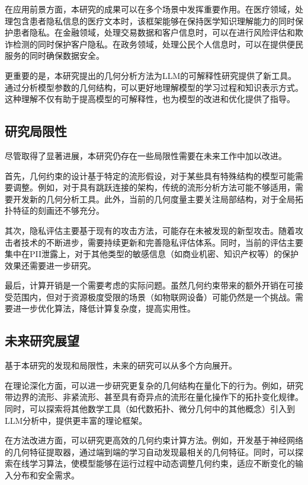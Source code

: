 在应用前景方面，本研究的成果可以在多个场景中发挥重要作用。在医疗领域，处理包含患者隐私信息的医疗文本时，该框架能够在保持医学知识理解能力的同时保护患者隐私。在金融领域，处理交易数据和客户信息时，可以在进行风险评估和欺诈检测的同时保护客户隐私。在政务领域，处理公民个人信息时，可以在提供便民服务的同时确保数据安全。

更重要的是，本研究提出的几何分析方法为LLM的可解释性研究提供了新工具。通过分析模型参数的几何结构，可以更好地理解模型的学习过程和知识表示方式。这种理解不仅有助于提高模型的可解释性，也为模型的改进和优化提供了指导。

\subsection{研究局限性}

尽管取得了显著进展，本研究仍存在一些局限性需要在未来工作中加以改进。

首先，几何约束的设计基于特定的流形假设，对于某些具有特殊结构的模型可能需要调整。例如，对于具有跳跃连接的架构，传统的流形分析方法可能不够适用，需要开发新的几何分析工具。此外，当前的几何度量主要关注局部结构，对于全局拓扑特征的刻画还不够充分。

其次，隐私评估主要基于现有的攻击方法，可能存在未被发现的新型攻击。随着攻击者技术的不断进步，需要持续更新和完善隐私评估体系。同时，当前的评估主要集中在PII泄露上，对于其他类型的敏感信息（如商业机密、知识产权等）的保护效果还需要进一步研究。

最后，计算开销是一个需要考虑的实际问题。虽然几何约束带来的额外开销在可接受范围内，但对于资源极度受限的场景（如物联网设备）可能仍然是一个挑战。需要进一步优化算法，降低计算复杂度，提高实用性。

\subsection{未来研究展望}

基于本研究的发现和局限性，未来的研究可以从多个方向展开。

在理论深化方面，可以进一步研究更复杂的几何结构在量化下的行为。例如，研究带边界的流形、非紧流形、甚至具有奇异点的流形在量化操作下的拓扑变化规律。同时，可以探索将其他数学工具（如代数拓扑、微分几何中的其他概念）引入到LLM分析中，提供更丰富的理论框架。

在方法改进方面，可以研究更高效的几何约束计算方法。例如，开发基于神经网络的几何特征提取器，通过端到端的学习自动发现最相关的几何特征。同时，可以探索在线学习算法，使模型能够在运行过程中动态调整几何约束，适应不断变化的输入分布和安全需求。

